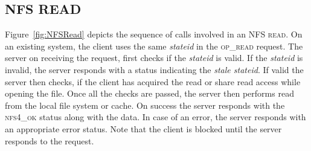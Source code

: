 \subsection{NFS READ}
Figure~\ref{fig:NFSRead} depicts the sequence of calls involved in an \textsc{NFS read}. On an existing system, the client uses the same \textit{stateid} in the \textsc{op\_read} request. The server on receiving the request, first checks if the \textit{stateid} is valid. If the \textit{stateid} is invalid, the server responds with a status indicating the \textit{stale stateid}. If valid the server then checks, if the client has acquired the read or share read access while opening the file. Once all the checks are passed, the server then performs read from the local file system or cache. On success the server responds with the \textsc{nfs4\_ok} status along with the data. In case of an error, the server responds with an appropriate error status. Note that the client is blocked until the server responds to the request.

